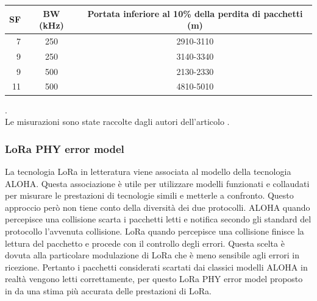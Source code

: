 \documentclass[a4paper]{report} %
\begin{document}
\begin{center}
\begin{tabular}{|r|c|c|}
SF&BW (kHz)&Portata inferiore al 10\% della perdita di pacchetti (m)\\ \hline
7&250&2910-3110\\ \hline
9&250&3140-3340\\ \hline
9&500&2130-2330\\ \hline
11&500&4810-5010\\ \hline
\end{tabular}
\label{Tabella 1}. \\
Le misurazioni sono state raccolte dagli autori dell'articolo \cite{art:rif.44}. \\
\end{center}

\subsubsection{LoRa PHY error model}
La tecnologia LoRa in letteratura viene associata al modello della tecnologia ALOHA. Questa associazione è utile per utilizzare modelli funzionati e collaudati per misurare le prestazioni di tecnologie simili e metterle a confronto. Questo approccio però non tiene conto della diversità dei due protocolli. ALOHA quando percepisce una collisione scarta i pacchetti letti e notifica secondo gli standard del protocollo l'avvenuta collisione. LoRa quando percepisce una collisione finisce la lettura del pacchetto e procede con il controllo degli errori. Questa scelta è dovuta alla particolare modulazione di LoRa che è meno sensibile agli errori in ricezione. Pertanto i pacchetti considerati scartati dai classici modelli ALOHA in realtà vengono letti correttamente, per questo LoRa PHY error model proposto in \cite{art:rif.49} da una stima più accurata delle prestazioni di LoRa.
\end{document}
